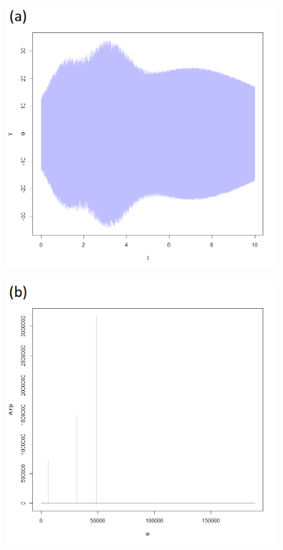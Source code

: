 \documentclass{article}
\begin{document}
 \begin{figure}[h]
 	\centering
 	\begin{subfigure}[t]{0.49\textwidth}
 		\centering
 		\includegraphics[width=\linewidth]{signal_build1.png}
 		\label{F1a}
 	\end{subfigure}
 	\hfill
 	\begin{subfigure}[t]{0.49\textwidth}
 		\centering
 		\includegraphics[width=\linewidth]{signal_build1_AmpSpec.png}

\end{subfigure}
\end{figure}
\end{document}
